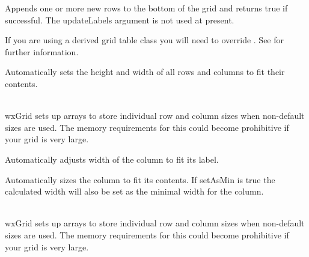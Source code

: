 \label{wxgridappendrows}


Appends one or more new rows to the bottom of the grid and returns true if
successful. The updateLabels argument is not used at present.

If you are using a derived grid table class you will need to override
. See
 for further information.



\label{wxgridautosize}


Automatically sets the height and width of all rows and columns to fit their contents.

\\
wxGrid sets up arrays to store individual row and column sizes when non-default sizes are used.
The memory requirements for this could become prohibitive if your grid is very large.



\label{wxgridautosizecollabelsize}


Automatically adjusts width of the column to fit its label.



\label{wxgridautosizecolumn}


Automatically sizes the column to fit its contents. If setAsMin is true the calculated width will
also be set as the minimal width for the column.

\\
wxGrid sets up arrays to store individual row and column sizes when non-default sizes are used.
The memory requirements for this could become prohibitive if your grid is very large.



\label{wxgridautosizecolumns}


